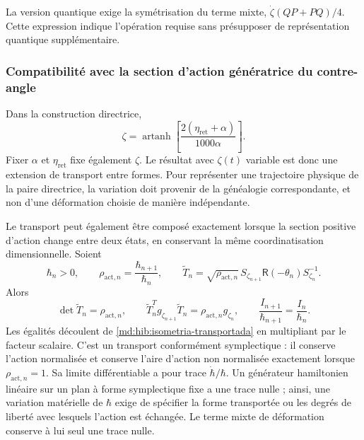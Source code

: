 La version quantique exige la symétrisation du terme mixte,
$\dot\zeta(QP+PQ)/4$. Cette expression indique l’opération requise sans
présupposer de représentation quantique supplémentaire.

\subsubsection{Compatibilité avec la section d’action génératrice du contre-angle}
\label{md:hib:compatibilidad-accion}

Dans la construction directrice,
\begin{equation}
 \zeta=\operatorname{artanh}
 \left[\frac{2(\eta_{\mathrm{ret}}+\alpha)}{1000\alpha}\right].
 \label{md:hib:forma-genealogica}
\end{equation}
Fixer $\alpha$ et $\eta_{\mathrm{ret}}$ fixe également $\zeta$.
Le résultat avec $\zeta(t)$ variable est donc une extension de
transport entre formes. Pour représenter une trajectoire physique de la paire
directrice, la variation doit provenir de la généalogie correspondante, et non
d’une déformation choisie de manière indépendante.

Le transport peut également être composé exactement lorsque la
section positive d’action change entre deux états, en conservant la même coordinatisation
dimensionnelle. Soient
\begin{equation}
 \hbar_n>0,\qquad
 \rho_{\mathrm{act},n}=\frac{\hbar_{n+1}}{\hbar_n},\qquad
 \widetilde T_n=\sqrt{\rho_{\mathrm{act},n}}\,
 S_{\zeta_{n+1}}\mathsf R(-\theta_n)S_{\zeta_n}^{-1}.
 \label{md:hib:transporte-conforme}
\end{equation}
Alors
\begin{equation}
 \det\widetilde T_n=\rho_{\mathrm{act},n},\qquad
 \widetilde T_n^Tg_{\zeta_{n+1}}\widetilde T_n
 =\rho_{\mathrm{act},n}g_{\zeta_n},\qquad
 \frac{I_{n+1}}{\hbar_{n+1}}=\frac{I_n}{\hbar_n}.
 \label{md:hib:accion-normalizada}
\end{equation}
Les égalités découlent de \eqref{md:hib:isometria-transportada} en multipliant
par le facteur scalaire. C’est un transport conformément symplectique : il conserve
l’action normalisée et conserve l’aire d’action non normalisée
exactement lorsque $\rho_{\mathrm{act},n}=1$.
Sa limite différentiable a pour trace $\dot\hbar/\hbar$. Un générateur
hamiltonien linéaire sur un plan à forme symplectique fixe a une trace nulle ;
ainsi, une variation matérielle de $\hbar$ exige de spécifier la forme
transportée ou les degrés de liberté avec lesquels l’action est échangée.
Le terme mixte de déformation conserve à lui seul une trace nulle.

